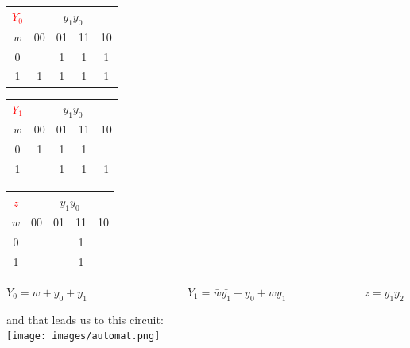 \documentclass[10pt,a4paper]{scrartcl}
\begin{document}
\begin{tabular}{|c||c|c|c|c|}
  \hline
\textcolor{red}{$Y_0$}    & \multicolumn{4}{c|}{$y_1y_0$} \\
$w$    & 00 & 01  & 11  & 10\\ \hline\hline
  0    &    & 1   & 1   & 1 \\ \hline
  1    & 1  & 1   & 1   & 1 \\ 
  \hline
\end{tabular}
\hspace{1cm}
\begin{tabular}{|c||c|c|c|c|}
  \hline
\textcolor{red}{$Y_1$}     & \multicolumn{4}{c|}{$y_1y_0$} \\
$w$    & 00 & 01  & 11  & 10\\ \hline\hline
  0    & 1  & 1   & 1   &   \\ \hline
  1    &    & 1   & 1   & 1 \\ 
  \hline
\end{tabular}
\hspace{1cm}
\begin{tabular}{|c||c|c|c|c|}
  \hline
\textcolor{red}{$z$}   & \multicolumn{4}{c|}{$y_1y_0$} \\
$w$    & 00 & 01  & 11  & 10\\ \hline\hline
  0    &    &     & 1   &   \\ \hline
  1    &    &     & 1   &   \\ 
  \hline
\end{tabular}

$Y_0=w+y_0+y_1\qquad\qquad\qquad\qquad\quad Y_1=\bar{w}\bar{y_1} + y_0 + wy_1\qquad\qquad\qquad\quad z=y_1y_2$

and that leads us to this circuit:\\
\texttt{[image: images/automat.png]} 


\FloatBarrier
\end{document}
